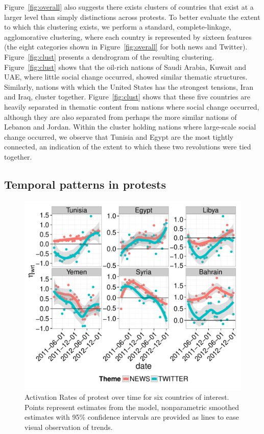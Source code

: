 Figure~\ref{fig:overall} also suggests there exists clusters of countries that exist at a larger level than simply distinctions across protests.  To better evaluate the extent to which this clustering exists, we perform a standard, complete-linkage, agglomorative clustering, where each country is represented by sixteen features (the eight categories shown in Figure~\ref{fig:overall} for both news and Twitter). Figure~\ref{fig:clust} presents a dendrogram of the resulting clustering.  Figure~\ref{fig:clust} shows that the oil-rich nations of Saudi Arabia, Kuwait and UAE, where little social change occurred, showed similar thematic structures.   Similarly, nations with which the United States has the strongest tensions, Iran and Iraq, cluster together.  Figure~\ref{fig:clust} shows that these five countries  are heavily separated in thematic content from nations where social change occurred, although they are also separated from perhaps the more similar nations of Lebanon and Jordan.  Within the cluster holding nations where large-scale social change occurred, we observe that Tunisia and Egypt are the most tightly connected, an indication of the extent to which these two revolutions were tied together. 

\subsection{Temporal patterns in protests}

\begin{figure}[t]
	\centering
	\includegraphics[width=.5\textwidth]{imgs/cottle}
	\caption{Activation Rates of protest over time for six countries of interest.  Points represent estimates from the model, nonparametric smoothed estimates with 95\% confidence intervals are provided as lines to ease visual observation of trends.}
	\label{fig:cottle4}
\end{figure}

